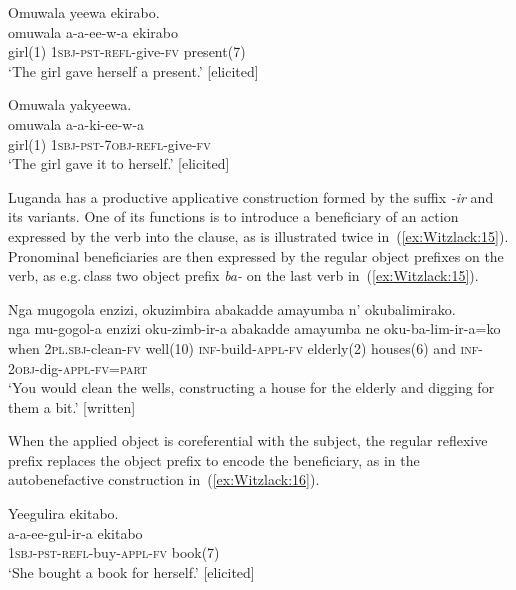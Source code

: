 \documentclass[output=paper,colorlinks,citecolor=brown,
]{langscibook}
\begin{document}
\ea \label{ex:Witzlack:18a}
    \glll Omuwala yeewa ekirabo.\\
    omuwala	a-a-ee-w-a		ekirabo\\
    girl(1)	\textsc{1sbj}-\textsc{pst}-\textsc{refl}-give-\textsc{fv}		present(7)\\
    \glt ‘The girl gave herself a present.’ [elicited]

\ex \label{ex:Witzlack:18b}
    \glll Omuwala yakyeewa.\\
    omuwala	a-a-ki-ee-w-a\\
    girl(1)	\textsc{1sbj}-\textsc{pst-7obj}-\textsc{refl}-give-\textsc{fv}\\
    \glt ‘The girl gave it to herself.’ [elicited]


\z 
\z



Luganda has a productive applicative construction formed by the suffix \emph{-ir} and its variants. One of its functions is to introduce a beneficiary of an action expressed by the verb into the clause, as is illustrated twice in~(\ref{ex:Witzlack:15}). 
Pronominal beneficiaries are then expressed by the regular object prefixes on the verb, as e.g.\,class two object prefix \emph{ba-} on the last verb in~(\ref{ex:Witzlack:15}). 

\ea
\label{ex:Witzlack:15}

\glll Nga mugogola enzizi, okuzimbira abakadde amayumba         n' okubalimirako.\\
    nga		mu-gogol-a	enzizi	oku-zimb-ir-a abakadde 	amayumba ne		oku-ba-lim-ir-a=ko\\
    when	\textsc{2pl.sbj}-clean-\textsc{fv}	well(10)	\textsc{inf}-build-\textsc{appl}-\textsc{fv} elderly(2)	houses(6) and	\textsc{inf-2obj}-dig-\textsc{appl}-\textsc{fv}=\textsc{part}\\
    \glt ‘You would clean the wells, constructing a house for the elderly and digging for them a bit.’ [written]	%

\z

When the applied object is coreferential with the subject, the regular reflexive prefix replaces the object prefix to encode the beneficiary, as in the autobenefactive construction in~(\ref{ex:Witzlack:16}).

\ea\label{ex:Witzlack:16}

\ea \label{ex:Witzlack:16a}
    \glll Yeegulira ekitabo.\\
    a-a-ee-gul-ir-a ekitabo\\
    \textsc{1sbj}-\textsc{pst}-\textsc{refl}-buy-\textsc{appl}-\textsc{fv}	book(7)\\
    \glt ‘She bought a book for herself.’ [elicited]
\end{document}
